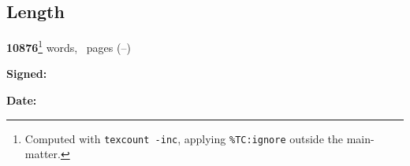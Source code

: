 \subsection*{Length}

\textbf{\color{red} 10876}\footnote{Computed with \texttt{texcount -inc}, applying \texttt{\%TC:ignore} outside the main-matter.} words, \textbf{\contentpages}~pages
(\pageref{firstcontentpage}--\pageref{lastcontentpage})


\vfill

\textbf{Signed:} 
\ifanonymised
\candidate
\else
\authorself{}
\fi

\vspace{0.5cm}
\textbf{Date:} \submissiondate{}
\vspace{3cm}

\endgroup
